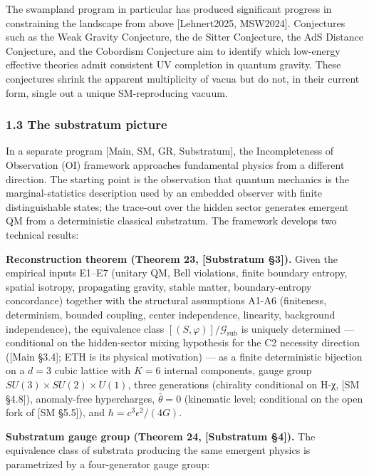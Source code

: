 \documentclass[
]{article}
\begin{document}
The swampland program in particular has produced significant progress in
constraining the landscape from above {[}Lehnert2025, MSW2024{]}.
Conjectures such as the Weak Gravity Conjecture, the de Sitter
Conjecture, the AdS Distance Conjecture, and the Cobordism Conjecture
aim to identify which low-energy effective theories admit consistent UV
completion in quantum gravity. These conjectures shrink the apparent
multiplicity of vacua but do not, in their current form, single out a
unique SM-reproducing vacuum.

\hypertarget{the-substratum-picture}{%
\subsubsection{1.3 The substratum
picture}\label{the-substratum-picture}}

In a separate program {[}Main, SM, GR, Substratum{]}, the Incompleteness
of Observation (OI) framework approaches fundamental physics from a
different direction. The starting point is the observation that quantum
mechanics is the marginal-statistics description used by an embedded
observer with finite distinguishable states; the trace-out over the
hidden sector generates emergent QM from a deterministic classical
substratum. The framework develops two technical results:

\textbf{Reconstruction theorem (Theorem 23, {[}Substratum §3{]}).} Given
the empirical inputs E1--E7 (unitary QM, Bell violations, finite
boundary entropy, spatial isotropy, propagating gravity, stable matter,
boundary-entropy concordance) together with the structural assumptions
A1-A6 (finiteness, determinism, bounded coupling, center independence,
linearity, background independence), the equivalence class
\([(S, \varphi)]/\mathcal{G}_{\text{sub}}\) is uniquely determined ---
conditional on the hidden-sector mixing hypothesis for the C2 necessity
direction ({[}Main §3.4{]}; ETH is its physical motivation) --- as a
finite deterministic bijection on a \(d=3\) cubic lattice with \(K = 6\)
internal components, gauge group \(SU(3) \times SU(2) \times U(1)\),
three generations (chirality conditional on H-χ, {[}SM §4.8{]}),
anomaly-free hypercharges, \(\bar\theta = 0\) (kinematic level;
conditional on the open fork of {[}SM §5.5{]}), and
\(\hbar = c^3 \epsilon^2/(4G)\).

\textbf{Substratum gauge group (Theorem 24, {[}Substratum §4{]}).} The
equivalence class of substrata producing the same emergent physics is
parametrized by a four-generator gauge group:
\end{document}

